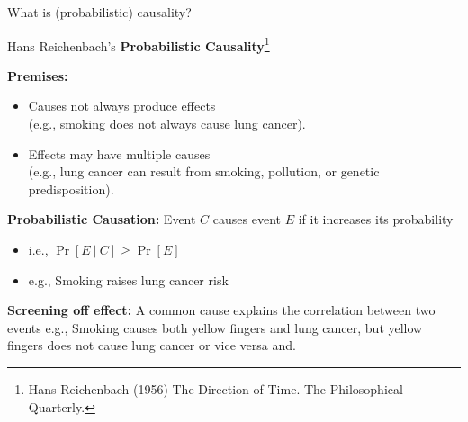 \documentclass[aspectratio=169]{beamer}
\begin{document}
\begin{frame}{What is (probabilistic) causality?}
\vspace{-0.4cm}

\begin{center}
    Hans Reichenbach's \textbf{Probabilistic Causality}\footnote{\scriptsize Hans Reichenbach (1956) The Direction of Time. The Philosophical Quarterly.
    } \\    
\end{center}

\textbf{Premises:} 
\begin{itemize}
    \item[$\bullet$] Causes not always produce effects \\
    (e.g., smoking does not always cause lung cancer).
    \item[$\bullet$] Effects may have multiple causes \\
    (e.g., lung cancer can result from smoking, pollution, or genetic predisposition).
\end{itemize}

\textbf{Probabilistic Causation:} Event $C$ causes event $E$ if it increases its probability \\
 {
\setlength{\leftmargini}{4.69cm}
\begin{itemize}
    \item[$\bullet$] i.e., $\Pr[E\ |\ C] \geq \Pr[E]$
    \item[$\bullet$] e.g., Smoking raises lung cancer risk
\end{itemize}
}

\textbf{Screening off effect:} A common cause explains the correlation between two events
e.g., Smoking causes both yellow fingers and lung cancer, but yellow fingers does not cause lung cancer or vice versa and.

\end{frame}
\end{document}
